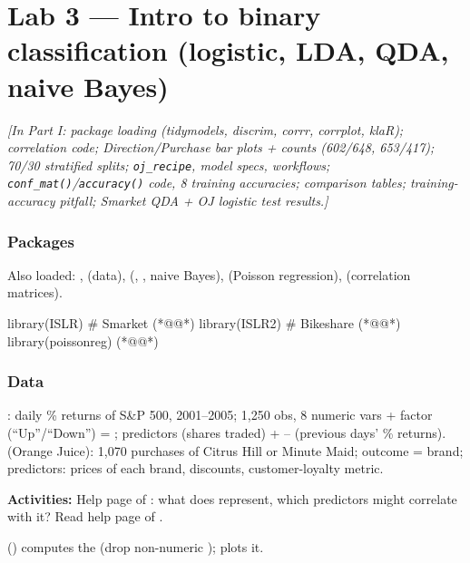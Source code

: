 \section{Lab 3 --- Intro to binary classification (logistic, LDA, QDA, naive Bayes)}
{\color{figgray}\itshape [In Part I: package loading (tidymodels, discrim, corrr, corrplot, klaR); correlation code; Direction/Purchase bar plots + counts (602/648, 653/417); 70/30 stratified splits; \texttt{oj\_recipe}, model specs, workflows; \texttt{conf\_mat()}/\texttt{accuracy()} code, 8 training accuracies; comparison tables; training-accuracy pitfall; Smarket QDA + OJ logistic test results.]}
%

\subsubsection{Packages}
Also loaded: ,  (data),  (, , naive Bayes),  (Poisson regression),  (correlation matrices).
\begin{rcode}
library(ISLR) # Smarket     (*@@*)
library(ISLR2) # Bikeshare  (*@@*)
library(poissonreg)         (*@@*)
\end{rcode}

\subsubsection{Data}
: daily \% returns of S\&P 500, 2001--2005; 1,250 obs, 8 numeric vars + factor  (``Up''/``Down'') = ; predictors  (shares traded) + -- (previous days' \% returns).
 (Orange Juice): 1,070 purchases of Citrus Hill or Minute Maid; outcome  = brand; predictors: prices of each brand, discounts, customer-loyalty metric.

\textbf{Activities:} Help page of : what does  represent, which predictors might correlate with it? Read help page of .

 () computes the  (drop non-numeric );  plots it.


